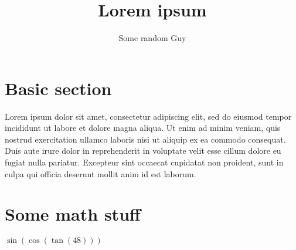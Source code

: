 \documentclass[12pt]{article}
\title{Lorem ipsum}
\author{Some random Guy}
\begin{document}
\maketitle
\section{Basic section}
Lorem ipsum dolor sit amet, consectetur adipiscing elit, sed do eiusmod tempor incididunt ut labore et dolore magna aliqua. Ut enim ad minim veniam, quis nostrud exercitation ullamco laboris nisi ut aliquip ex ea commodo consequat. Duis aute irure dolor in reprehenderit in voluptate velit esse cillum dolore eu fugiat nulla pariatur. Excepteur sint occaecat cupidatat non proident, sunt in culpa qui officia deserunt mollit anim id est laborum. \\
\section{Some math stuff}
\(\sin(\cos(\tan(48)))\)
\end{document}
